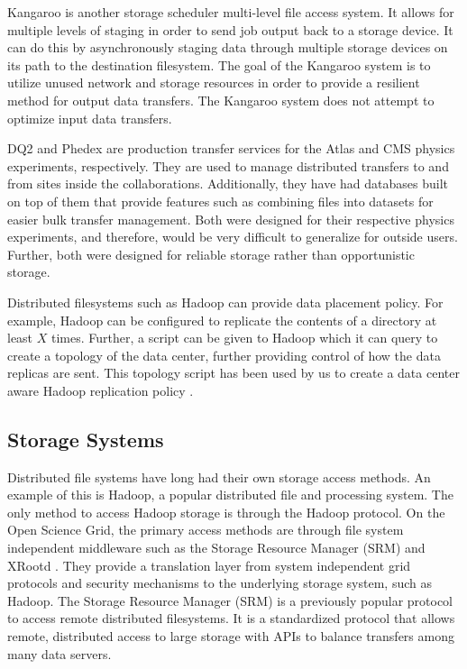 Kangaroo \cite{thain2001kangaroo} is another storage scheduler multi-level file access system.  It allows for multiple levels of staging in order to send job output back to a storage device.  It can do this by asynchronously staging data through multiple storage devices on its path to the destination filesystem.  The goal of the Kangaroo system is to utilize unused network and storage resources in order to provide a resilient method for output data transfers.  The Kangaroo system does not attempt to optimize input data transfers.


DQ2 \cite{branco2008managing} and Phedex \cite{rehn2006phedex} are production transfer services for the Atlas and CMS physics experiments, respectively.  They are used to manage distributed transfers to and from sites inside the collaborations.  Additionally, they have had databases built on top of them that provide features such as combining files into datasets for easier bulk transfer management.  Both were designed for their respective physics experiments, and therefore, would be very difficult to generalize for outside users.  Further, both were designed for reliable storage rather than opportunistic storage.

Distributed filesystems such as Hadoop \cite{white2012hadoop} can provide data placement policy.  For example, Hadoop can be configured to replicate the contents of a directory at least $X$ times.  Further, a script can be given to Hadoop which it can query to create a topology of the data center, further providing control of how the data replicas are sent.  This topology script has been used by us to create a data center aware Hadoop replication policy \cite{he2012hog}.

\subsection{Storage Systems}

Distributed file systems have long had their own storage access methods.  An example of this is Hadoop, a popular distributed file and processing system.  The only method to access Hadoop storage is through the Hadoop protocol.  On the Open Science Grid, the primary access methods are through file system independent middleware such as the Storage Resource Manager (SRM) \cite{shoshani2002storage} and XRootd \cite{dorigo2005xrootd}.  They provide a translation layer from system independent grid protocols and security mechanisms to the underlying storage system, such as Hadoop.  The Storage Resource Manager (SRM) is a previously popular protocol to access remote distributed filesystems.  It is a standardized protocol that allows remote, distributed access to large storage with APIs to balance transfers among many data servers.


